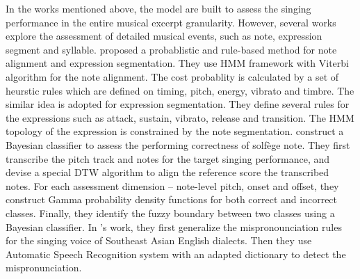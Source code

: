 In the works mentioned above, the model are built to assess the singing performance in the entire musical excerpt granularity. However, several works explore the assessment of detailed musical events, such as note, expression segment and syllable.  proposed a probablistic and rule-based method for note alignment and expression segmentation. They use \gls{HMM} framework with Viterbi algorithm for the note alignment. The cost probablity is calculated by a set of heurstic rules which are defined on timing, pitch, energy, vibrato and timbre. The similar idea is adopted for expression segmentation. They define several rules for the expressions such as attack, sustain, vibrato, release and transition. The \gls{HMM} topology of the expression is constrained by the note segmentation.  construct a Bayesian classifier to assess the performing correctness of solfège note. They first transcribe the pitch track and notes for the target singing performance, and devise a special \gls{DTW} algorithm to align the reference score the transcribed notes. For each assessment dimension -- note-level pitch, onset and offset, they construct Gamma probability density functions for both correct and incorrect classes. Finally, they identify the fuzzy boundary between two classes using a Bayesian classifier. In 's work, they first generalize the mispronounciation rules for the singing voice of Southeast Asian English dialects. Then they use Automatic Speech Recognition system with an adapted dictionary to detect the mispronunciation.

